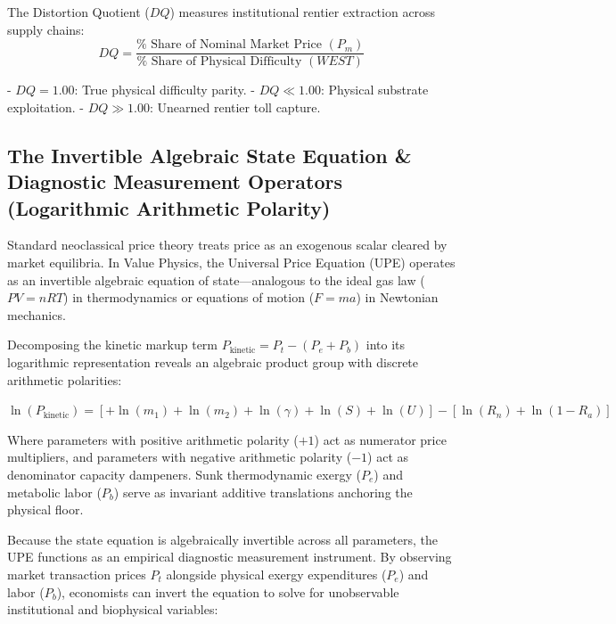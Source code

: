\documentclass[preprint,12pt,authoryear]{elsarticle}
\theoremstyle{definition}
\begin{document}
  

The Distortion Quotient ($DQ$) measures institutional rentier extraction across supply chains:  
$$DQ = \frac{\% \text{ Share of Nominal Market Price } (P_m)}{\% \text{ Share of Physical Difficulty } (WEST)}$$

  

  - $DQ = 1.00$: True physical difficulty parity.
  - $DQ \ll 1.00$: Physical substrate exploitation.
  - $DQ \gg 1.00$: Unearned rentier toll capture.

  

\subsection{The Invertible Algebraic State Equation \& Diagnostic Measurement Operators (Logarithmic Arithmetic Polarity)}

Standard neoclassical price theory treats price as an exogenous scalar cleared by market equilibria. In Value Physics, the Universal Price Equation (UPE) operates as an invertible algebraic equation of state—analogous to the ideal gas law ($PV = nRT$) in thermodynamics or equations of motion ($F = ma$) in Newtonian mechanics.

Decomposing the kinetic markup term $P_{\text{kinetic}} = P_t - (P_e + P_b)$ into its logarithmic representation reveals an algebraic product group with discrete arithmetic polarities:

$\ln(P_{\text{kinetic}}) = [ +\ln(m_1) + \ln(m_2) + \ln(\gamma) + \ln(S) + \ln(U) ] - [ \ln(R_n) + \ln(1 - R_a) ]$

Where parameters with positive arithmetic polarity ($+1$) act as numerator price multipliers, and parameters with negative arithmetic polarity ($-1$) act as denominator capacity dampeners. Sunk thermodynamic exergy ($P_e$) and metabolic labor ($P_b$) serve as invariant additive translations anchoring the physical floor.

Because the state equation is algebraically invertible across all parameters, the UPE functions as an empirical diagnostic measurement instrument. By observing market transaction prices $P_t$ alongside physical exergy expenditures ($P_e$) and labor ($P_b$), economists can invert the equation to solve for unobservable institutional and biophysical variables:
\end{document}
